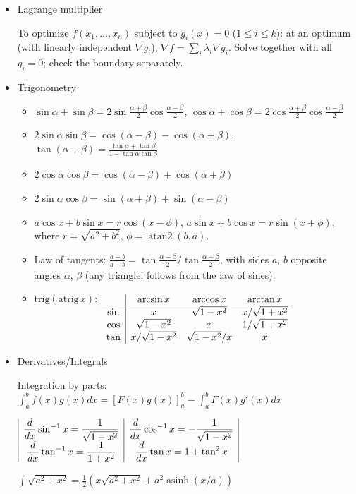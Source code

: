 \begin{itemize}
\item Lagrange multiplier

To optimize $f(x_1, \ldots, x_n)$ subject to $g_i(x) = 0$ ($1 \le i \le k$): at an optimum (with linearly independent $\nabla g_i$), $\nabla f = \sum_i \lambda_i \nabla g_i$. Solve together with all $g_i = 0$; check the boundary separately.

\item Trigonometry

\begin{itemize}
  \item $\sin\alpha+\sin\beta = 2\sin\frac{\alpha+\beta}{2}\cos\frac{\alpha-\beta}{2}$, \quad $\cos\alpha+\cos\beta = 2\cos\frac{\alpha+\beta}{2}\cos\frac{\alpha-\beta}{2}$
  \item $2\sin\alpha\sin\beta = \cos(\alpha-\beta)-\cos(\alpha+\beta)$, \quad $\tan(\alpha+\beta) = \frac{\tan\alpha+\tan\beta}{1-\tan\alpha\tan\beta}$
  \item $2\cos\alpha\cos\beta = \cos(\alpha-\beta)+\cos(\alpha+\beta)$
  \item $2\sin\alpha\cos\beta = \sin(\alpha+\beta)+\sin(\alpha-\beta)$
  \item $a\cos x+b\sin x = r\cos(x-\phi)$, \quad $a\sin x+b\cos x = r\sin(x+\phi)$, where $r = \sqrt{a^2+b^2}$, $\phi = \operatorname{atan2}(b, a)$.
  \item Law of tangents: $\frac{a-b}{a+b} = \tan\frac{\alpha-\beta}{2} \big/ \tan\frac{\alpha+\beta}{2}$, with sides $a$, $b$ opposite angles $\alpha$, $\beta$ (any triangle; follows from the law of sines).
  \item $\mathrm{trig}(\mathrm{atrig}\,x)$: $\begin{array}[t]{c|ccc}
     & \arcsin x & \arccos x & \arctan x \\ \hline
    \sin & x & \sqrt{1-x^2} & x/\sqrt{1+x^2} \\
    \cos & \sqrt{1-x^2} & x & 1/\sqrt{1+x^2} \\
    \tan & x/\sqrt{1-x^2} & \sqrt{1-x^2}/x & x
  \end{array}$
\end{itemize}

\item Derivatives/Integrals

Integration by parts:
\(\int_a^bf(x)g(x)dx = [F(x)g(x)]_a^b-\int_a^bF(x)g'(x)dx\)
{
\setlength{\arraycolsep}{1pt}
\noindent
$\begin{array}{|*{2}{>{\displaystyle}c|}}
\frac{d}{dx}\sin^{-1} x = \frac{1}{\sqrt{1-x^2}}
    &
\frac{d}{dx}\cos^{-1} x = -\frac{1}{\sqrt{1-x^2}}
\\
\frac{d}{dx}\tan^{-1} x = \frac{1}{1+x^2}
    &
\frac{d}{dx}\tan x = 1+\tan^2 x
\\
\end{array}$

\(
\displaystyle
\int \sqrt{a^2 + x^2} = \frac{1}{2} \left(x\sqrt{a^2+x^2} + a^2 \operatorname{asinh}(x/a) \right)
\)
}
\end{itemize}
